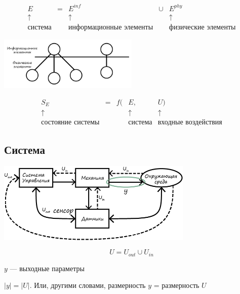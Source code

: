 \documentclass[12pt]{article}
\begin{document}
\begin{sloppypar}
    \[
        \begin{array}{ccccc}
            E              & = & E^{\textit{inf}}               & \cup & E^{phy}                    \\
            \uparrow       &   & \uparrow                       &      & \uparrow                   \\
            \text{система} &   & \text{информационные элементы} &      & \text{физические элементы}
        \end{array}
    \]
    \begin{center}
        \includegraphics[width=0.5\textwidth]{graphics/Информационные_и_физические_элементы.png}
    \end{center}
    \[
        \begin{array}{ccccc}
            S_E                      & = & f( & E,             & U)                         \\
            \uparrow                 &   &    & \uparrow       & \uparrow                   \\
            \text{состояние системы} &   &    & \text{система} & \text{входные воздействия}
        \end{array}
    \]

    \subsection*{Система}

    \begin{center}
        \includegraphics[width=0.7\textwidth]{graphics/Система.png}
    \end{center}

    \[
        U = U_{out} \cup U_{in}
    \]

    $y$ — выходные параметры

    $|y| = |U|$. Или, другими словами, размерность $y$ = размерность $U$

\end{sloppypar}
\end{document}
